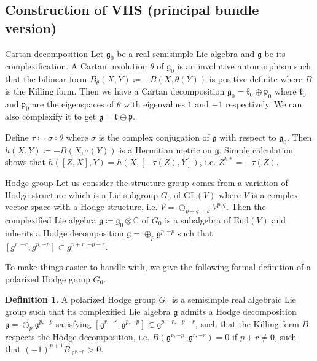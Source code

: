\documentclass[aspectratio=169, 10pt]{beamer}
\theoremstyle{definition}
\newtheorem{Def}{Definition}
\theoremstyle{example}
\begin{document}
	\subsection{Construction of VHS (principal bundle version)}
	
	\begin{frame}{Cartan decomposition}
		Let $\mathfrak{g}_0$ be a real semisimple Lie algebra and $\mathfrak{g}$ be its complexification. A Cartan involution $\theta$ of $\mathfrak{g}_0$ is an involutive automorphism such that the bilinear form $B_{\theta}(X,Y)\coloneqq -B(X,\theta(Y))$ is positive definite where $B$ is the Killing form. Then we have a Cartan decomposition $\mathfrak{g}_0=\mathfrak{k}_0\oplus \mathfrak{p}_0$ where $\mathfrak{k}_0$ and $\mathfrak{p}_0$ are the eigenspaces of $\theta$ with eigenvalues $1$ and $-1$ respectively. We can also complexify it to get $\mathfrak{g}=\mathfrak{k}\oplus \mathfrak{p}$.

		Define $\tau\coloneqq \sigma \circ \theta$ where $\sigma$ is the complex conjugation of $\mathfrak{g}$ with respect to $\mathfrak{g}_0$. Then $h(X,Y)\coloneqq -B(X,\tau(Y))$ is a Hermitian metric on $\mathfrak{g}$. Simple calculation shows that $h([Z,X],Y)=h(X,[-\tau(Z),Y])$, i.e. $Z^{h*}=-\tau(Z)$.
	\end{frame}
	\begin{frame}{Hodge group}
		Let us consider the structure group comes from a variation of Hodge structure which is a Lie subgroup $G_0$ of $\mathrm{GL}(V)$ where $V$ is a complex vector space with a Hodge structure, i.e. $V=\oplus_{p+q=k} V^{p,q}$. Then the complexified Lie algebra $\mathfrak{g}\coloneqq \mathfrak{g}_0\otimes \mathbb{C}$ of $G_0$ is a subalgebra of $\mathrm{End}(V)$ and inherits a Hodge decomposition $\mathfrak{g}=\oplus_{p}\mathfrak{g}^{p,-p}$ such that $[g^{r,-r}, g^{p,-p}]\subset g^{p+r,-p-r}$.

		To make things easier to handle with, we give the following formal definition of a polarized Hodge group $G_0$.
		\begin{Def}\label{Hodge group}
			A polarized Hodge group $G_0$ is a semisimple real algebraic Lie group such that its complexified Lie algebra $\mathfrak{g}$ admits a Hodge decomposition $\mathfrak{g}=\oplus_{p}\mathfrak{g}^{p,-p}$ satisfying $[\mathfrak{g}^{r,-r}, \mathfrak{g}^{p,-p}]\subset \mathfrak{g}^{p+r,-p-r}$, such that the Killing form $B$ respects the Hodge decomposition, i.e. $B(\mathfrak{g}^{p,-p}, \mathfrak{g}^{r,-r})=0$ if $p+r\neq 0$, such that $(-1)^{p+1}B_{|\mathfrak{g}^{p,-p}}>0$.
		\end{Def}
	\end{frame}
\end{document}
